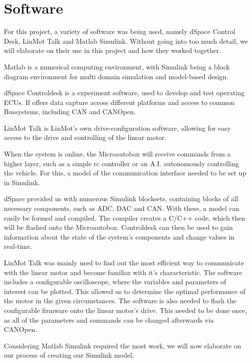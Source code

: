 
\chapter{Software}
\label{chp:Software}

For this project, a variety of software was being used, namely dSpace Control Desk, LinMot Talk and Matlab Simulink. Without going into too much detail, we will elaborate on their use in this project and how they worked together.


Matlab is a numerical computing environment, with Simulink being a block diagram environment for multi domain simulation and model-based design.

dSpace Controldesk is a experiment software, used to develop and test operating ECUs. If offers data capture across different platforms and access to common Bussystems, including CAN and CANOpen.

LinMot Talk is LinMot's own drive-configuration software, allowing for easy access to the drive and controlling of the linear motor.

When the system is online, the Microautobox will receive commands from a higher layer, such as a simple rc controller or an A.I. autonomously controlling the vehicle. For this, a model of the communication interface needed to be set up in Simulink.

dSpace provided us with numerous Simulink blocksets, containing blocks of all necessary components, such as ADC, DAC and CAN. With these, a model can easily be formed and compiled. The compiler creates a C/C++ code, which then will be flashed onto the Microautobox. Controldesk can then be used to gain information about the state of the system's components and change values in real-time.

LinMot Talk was mainly used to find out the most efficient way to communicate with the linear motor and become familiar with it's characteristic. The software includes a configurable oscilloscope, where the variables and parameters of interest can be plotted. This allowed us to determine the optimal performance of the motor in the given circumstances.
The software is also needed to flash the configurable firmware onto the linear motor's drive. This needed to be done once, as all of the parameters and commands can be changed afterwards via CANOpen.



Considering Matlab Simulink required the most work, we will now elaborate on our process of creating our Simulink model.